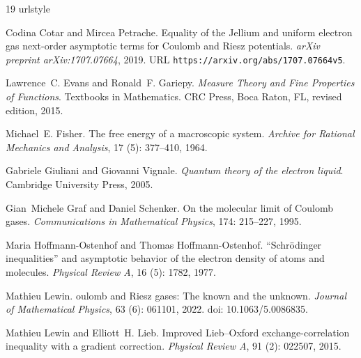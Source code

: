 \documentclass[final,reqno]{amsart}
\theoremstyle{remark}
\theoremstyle{definition}
\begin{document}
\begin{thebibliography}{19}
\providecommand{\natexlab}[1]{#1}
\providecommand{\url}[1]{\texttt{#1}}
\expandafter\ifx\csname urlstyle\endcsname\relax
  \providecommand{\doi}[1]{doi: #1}\else
  \providecommand{\doi}{doi: \begingroup \urlstyle{rm}\Url}\fi

Codina Cotar and Mircea Petrache.
\newblock Equality of the {J}ellium and uniform electron gas next-order
  asymptotic terms for {C}oulomb and {R}iesz potentials.
\newblock \emph{arXiv preprint arXiv:1707.07664}, 2019.
\newblock URL \url{https://arxiv.org/abs/1707.07664v5}.

Lawrence~C. Evans and Ronald~F. Gariepy.
\newblock \emph{Measure Theory and Fine Properties of Functions}.
\newblock Textbooks in Mathematics. CRC Press, Boca Raton, FL, revised edition,
  2015.

Michael~E. Fisher.
\newblock The free energy of a macroscopic system.
\newblock \emph{Archive for Rational Mechanics and Analysis}, 17
  (5): 377--410, 1964.

Gabriele Giuliani and Giovanni Vignale.
\newblock \emph{Quantum theory of the electron liquid}.
\newblock Cambridge University Press, 2005.

Gian~Michele Graf and Daniel Schenker.
\newblock On the molecular limit of {C}oulomb gases.
\newblock \emph{Communications in Mathematical Physics}, 174:
  215--227, 1995.

Maria Hoffmann-Ostenhof and Thomas Hoffmann-Ostenhof.
\newblock ``{S}chr{\"o}dinger inequalities'' and asymptotic behavior of the
  electron density of atoms and molecules.
\newblock \emph{Physical Review A}, 16 (5): 1782, 1977.

Mathieu Lewin.
oulomb and {R}iesz gases: {T}he known and the unknown.
\newblock \emph{Journal of Mathematical Physics}, 63 (6):
  061101, 2022.
\newblock \doi{10.1063/5.0086835}.

Mathieu Lewin and Elliott~H. Lieb.
\newblock Improved {L}ieb--{O}xford exchange-correlation inequality with a
  gradient correction.
\newblock \emph{Physical Review A}, 91 (2): 022507, 2015.


\end{thebibliography}
\end{document}

